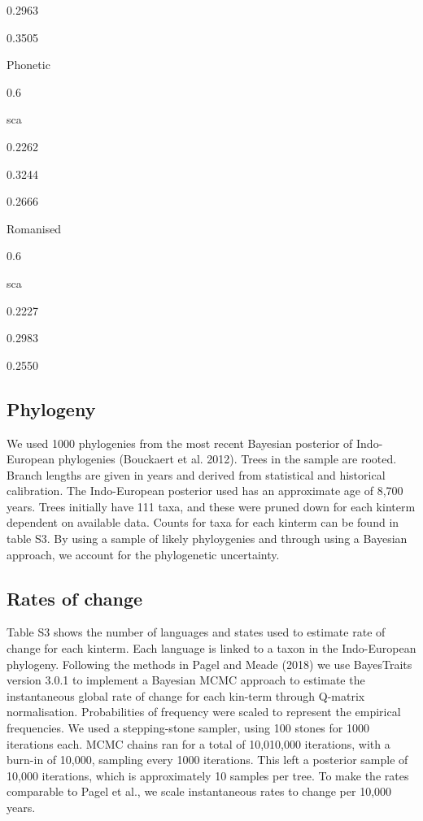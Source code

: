 \documentclass[]{article}
\begin{document}
0.2963

0.3505

Phonetic

0.6

sca

0.2262

0.3244

0.2666

Romanised

0.6

sca

0.2227

0.2983

0.2550

\subsection{Phylogeny}\label{phylogeny}

We used 1000 phylogenies from the most recent Bayesian posterior of
Indo-European phylogenies (Bouckaert et al. 2012). Trees in the sample
are rooted. Branch lengths are given in years and derived from
statistical and historical calibration. The Indo-European posterior used
has an approximate age of 8,700 years. Trees initially have 111 taxa,
and these were pruned down for each kinterm dependent on available data.
Counts for taxa for each kinterm can be found in table S3. By using a
sample of likely phyloygenies and through using a Bayesian approach, we
account for the phylogenetic uncertainty.

\subsection{Rates of change}\label{rates-of-change}

Table S3 shows the number of languages and states used to estimate rate
of change for each kinterm. Each language is linked to a taxon in the
Indo-European phylogeny. Following the methods in Pagel and Meade (2018)
we use BayesTraits version 3.0.1 to implement a Bayesian MCMC approach
to estimate the instantaneous global rate of change for each kin-term
through Q-matrix normalisation. Probabilities of frequency were scaled
to represent the empirical frequencies. We used a stepping-stone
sampler, using 100 stones for 1000 iterations each. MCMC chains ran for
a total of 10,010,000 iterations, with a burn-in of 10,000, sampling
every 1000 iterations. This left a posterior sample of 10,000
iterations, which is approximately 10 samples per tree. To make the
rates comparable to Pagel et al., we scale instantaneous rates to change
per 10,000 years.
\end{document}
